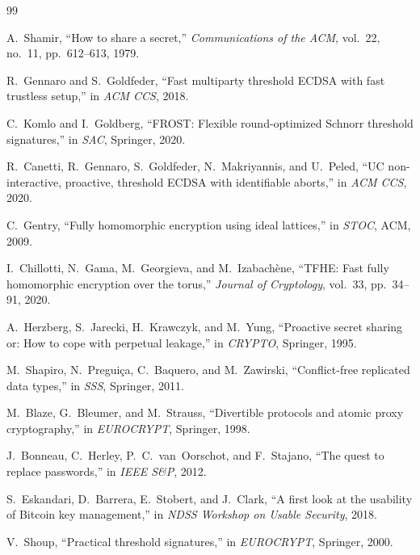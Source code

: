 \begin{thebibliography}{99}

A.~Shamir, ``How to share a secret,'' \emph{Communications of the ACM}, vol.~22, no.~11, pp.~612--613, 1979.

R.~Gennaro and S.~Goldfeder, ``Fast multiparty threshold ECDSA with fast trustless setup,'' in \emph{ACM CCS}, 2018.

C.~Komlo and I.~Goldberg, ``FROST: Flexible round-optimized Schnorr threshold signatures,'' in \emph{SAC}, Springer, 2020.

R.~Canetti, R.~Gennaro, S.~Goldfeder, N.~Makriyannis, and U.~Peled, ``UC non-interactive, proactive, threshold ECDSA with identifiable aborts,'' in \emph{ACM CCS}, 2020.

C.~Gentry, ``Fully homomorphic encryption using ideal lattices,'' in \emph{STOC}, ACM, 2009.

I.~Chillotti, N.~Gama, M.~Georgieva, and M.~Izabach\`ene, ``TFHE: Fast fully homomorphic encryption over the torus,'' \emph{Journal of Cryptology}, vol.~33, pp.~34--91, 2020.

A.~Herzberg, S.~Jarecki, H.~Krawczyk, and M.~Yung, ``Proactive secret sharing or: How to cope with perpetual leakage,'' in \emph{CRYPTO}, Springer, 1995.

M.~Shapiro, N.~Pregui\c{c}a, C.~Baquero, and M.~Zawirski, ``Conflict-free replicated data types,'' in \emph{SSS}, Springer, 2011.

M.~Blaze, G.~Bleumer, and M.~Strauss, ``Divertible protocols and atomic proxy cryptography,'' in \emph{EUROCRYPT}, Springer, 1998.

J.~Bonneau, C.~Herley, P.~C.~van~Oorschot, and F.~Stajano, ``The quest to replace passwords,'' in \emph{IEEE S\&P}, 2012.

S.~Eskandari, D.~Barrera, E.~Stobert, and J.~Clark, ``A first look at the usability of Bitcoin key management,'' in \emph{NDSS Workshop on Usable Security}, 2018.

V.~Shoup, ``Practical threshold signatures,'' in \emph{EUROCRYPT}, Springer, 2000.

\end{thebibliography}

